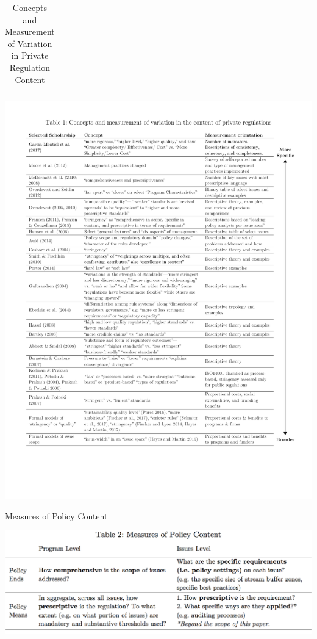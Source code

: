 \documentclass{article}
\begin{document}
\begin{table}[h!]
\renewcommand{\arraystretch}{1.5} 
\centering
\caption{Concepts and Measurement of Variation in Private Regulation Content}
\label{lit}
\begin{tabular}{|l|c|c|c|}
\hline
\end{tabular}
\end{table}
\centering
\includegraphics[trim=.5in 1in .5in .9in,clip,width = \textwidth]{table1.pdf}

\newpage

\begin{table}[h!]
\renewcommand{\arraystretch}{1.5} 
\centering
\caption{Measures of Policy Content}
\label{questions}

\end{table}
\centering
\includegraphics[trim=0 0 0 2.3cm,clip,width = \textwidth]{table2}
\end{document}
